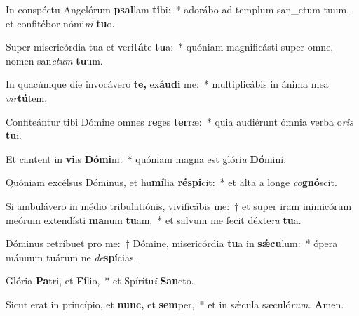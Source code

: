 \item In conspéctu Angelórum \textbf{psal}lam \textbf{ti}bi:~* adorábo ad templum san\_ctum tuum, et confitébor nómi\textit{ni} \textbf{tu}o.
\item Super misericórdia tua et veri\textbf{tá}te \textbf{tu}a:~* quóniam magnificásti super omne, nomen san\tinyhspace\textit{ctum} \textbf{tu}um.
\item In quacúmque die invocávero \textbf{te,} ex\textbf{áu}\textbf{di} me:~* multiplicábis in ánima mea \textit{vir}\textbf{tú}tem.
\item Confiteántur tibi Dómine omnes \textbf{re}ges \textbf{ter}ræ:~* quia audiérunt ómnia verba o\textit{ris} \textbf{tu}i.
\item Et cantent in \textbf{vi}is \textbf{Dó}\textbf{mi}ni:~* quóniam magna est glóri\tinyhspace\textit{a} \textbf{Dó}mini.
\item Quóniam excélsus Dóminus, et hu\textbf{mí}lia \textbf{ré}\textbf{spi}cit:~* et alta a longe \textit{co}\textbf{gnó}scit.
\item Si ambulávero in médio tribulatiónis, vivificábis me:~† et super iram inimicórum meórum extendísti \textbf{ma}num \textbf{tu}am,~* et salvum me fecit déxte\textit{ra} \textbf{tu}a.
\item Dóminus retríbuet pro me:~† Dómine, misericórdia \textbf{tu}a in \textbf{sǽ}\textbf{cu}lum:~* ópera mánuum tuárum ne \textit{de}\textbf{spí}cias.
\item Glória \textbf{Pa}tri, et \textbf{Fí}lio,~* et Spírítu\textit{i} \textbf{San}cto.
\item Sicut erat in princípio, et \textbf{nunc,} et \textbf{sem}per,~* et in sǽcula sæculó\textit{rum.} \textbf{A}men.